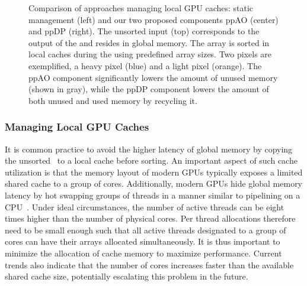 \documentclass{egpubl}
\newcommand{\green}[1]{{\color{PineGreen}#1}}
\newcommand{\new}[1]{\green{#1}}
\newcommand{\stencil}{ppAO}
\newcommand{\dloop}{ppDP}
\begin{document}
\begin{figure}[t]
  \centering
  \def\svgwidth{\textwidth}%
  \graphicspath{{figures/}}%
  {\sffamily\footnotesize}
  \caption{\label{fig:abuffer-local} %
    Comparison of approaches managing local GPU caches: static management (left) and our two proposed components \stencil{} (center) and \dloop{} (right).
    The unsorted input \bFraglist{} (top) corresponds to the output of the \sFill{} and resides in global memory. 
    The array is sorted in local caches during the \sResolve{} using predefined array sizes. 
    Two pixels are exemplified, a heavy pixel (blue) and a light pixel (orange). 
    The \stencil{} component significantly lowers the amount of unused memory (shown in gray), while the \dloop{} component lowers the amount of both unused and used memory by recycling it.
  }
\end{figure}


\subsubsection*{Managing Local GPU Caches}

It is common practice to avoid the higher latency of global memory by copying the unsorted \bFraglist\ to a local cache before sorting.
An important aspect of such cache utilization is that the memory layout of modern GPUs typically exposes a limited shared cache to a group of cores. 
Additionally, modern GPUs hide global memory latency by hot swapping groups of threads in a manner similar to pipelining on a CPU~\cite{Nvidia2011}. 
Under ideal circumstances, the number of active threads \new{can be} eight times higher than the number of physical cores. 
Per thread allocations therefore need to be small enough such that all active threads designated to a group of cores can have their arrays allocated simultaneously. 
It is thus important to minimize the allocation of cache memory to maximize performance. 
Current trends also indicate that the number of cores increases faster than the available shared cache size, potentially escalating this problem in the future. 
\end{document}
